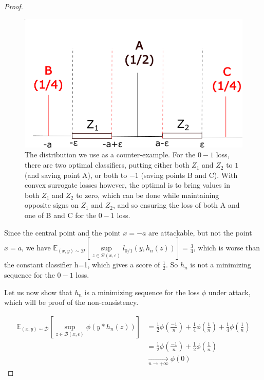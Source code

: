 \begin{proof}
\begin{figure}
    \centering
    \includegraphics[scale=0.6]{sections/3_calibration/images/example.png}
    \caption{The distribution we use as a counter-example. For the $0-1$ loss, there are two optimal classifiers, putting either both $Z_1$ and $Z_2$ to $1$ (and saving point A), or both to $-1$ (saving points B and C). With convex surrogate losses however, the optimal is to bring values in both $Z_1$ and $Z_2$ to zero, which can be done while maintaining opposite signs on $Z_1$ and $Z_2$, and so ensuring the loss of both A and one of B and C for the $0-1$ loss. }
    \label{fig:my_label}
\end{figure}


Since the central point and the point $x=-a$ are attackable, but not the point $x=a$, we have $\mathbb{E}_{(x,y)\sim \mathcal{D}}\left[ \sup\limits_{z \in \mathcal{B}(x,\epsilon)} l_{0/1}(y,h_n(z))\right] = \frac{3}{4}$, which is worse than the constant classifier h=1, which gives a score of $\frac{1}{2}$. So $h_n$ is not a minimizing sequence for the $0-1$ loss.

Let us now show that $h_n$ is a minimizing sequence for the loss $\phi$ under attack, which will be proof of the non-consistency.

\begin{align*}
    \mathbb{E}_{(x,y)\sim \mathcal{D}}\left[ \sup\limits_{z \in \mathcal{B}(x,\epsilon)} \phi(y*h_n(z))\right] &= \frac{1}{2} \phi(\frac{-1}{n}) +\frac{1}{4}\phi(\frac{1}{n}) + \frac{1}{4}\phi(\frac{1}{n})\\
    &=\frac{1}{2}\phi(\frac{-1}{n}) + \frac{1}{2}\phi(\frac{1}{n}) \\
    &\underset{n\to +\infty}{\longrightarrow}\phi(0)
\end{align*}


\end{proof}
